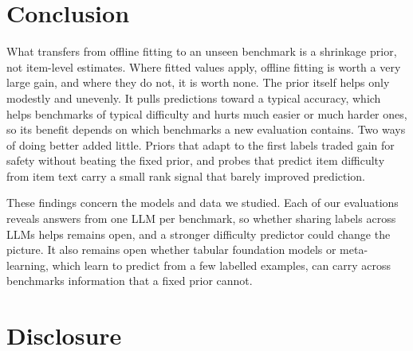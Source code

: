 \documentclass{article}
\begin{document}
\section{Conclusion}

What transfers from offline fitting to an unseen benchmark is a shrinkage prior, not item-level estimates. Where fitted values apply, offline fitting is worth a very large gain, and where they do not, it is worth none. The prior itself helps only modestly and unevenly. It pulls predictions toward a typical accuracy, which helps benchmarks of typical difficulty and hurts much easier or much harder ones, so its benefit depends on which benchmarks a new evaluation contains. Two ways of doing better added little. Priors that adapt to the first labels traded gain for safety without beating the fixed prior, and probes that predict item difficulty from item text carry a small rank signal that barely improved prediction.

These findings concern the models and data we studied. Each of our evaluations reveals answers from one LLM per benchmark, so whether sharing labels across LLMs helps remains open, and a stronger difficulty predictor could change the picture. It also remains open whether tabular foundation models or meta-learning, which learn to predict from a few labelled examples, can carry across benchmarks information that a fixed prior cannot.

\section*{Disclosure}


\clearpage
{\small


}

\clearpage
\appendix
{}\vspace{4pt}
\end{document}
